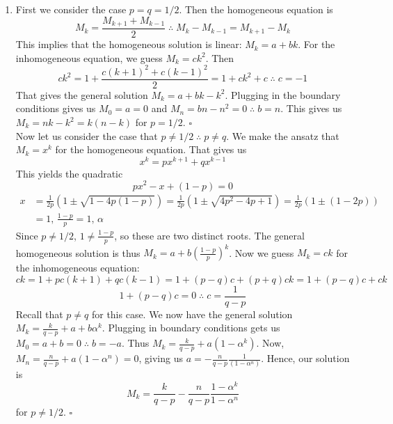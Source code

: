 \documentclass[letterpaper,12pt]{article}
\renewcommand*{\qed}{\hfill\ensuremath{\square}}
\begin{document}
\begin{flushleft}
\begin{enumerate}[label=(\alph*)]
        \item
        First we consider the case $p = q = 1/2$. Then the homogeneous equation is
        $$M_k = \frac{M_{k+1} + M_{k-1}}{2} \; \therefore \; M_{k} - M_{k-1} = M_{k+1} - M_{k}$$
        This implies that the homogeneous solution is linear: $M_k = a + bk$. For the inhomogeneous equation, we guess $M_k = ck^2$. Then
        $$ck^2 = 1 + \frac{c(k+1)^2 + c(k-1)^2}{2} = 1 + ck^2 + c \; \therefore \; c = -1$$
        That gives the general solution $M_k = a + bk - k^2$. Plugging in the boundary conditions gives us $M_0 = a = 0$ and $M_n = bn - n^2 = 0 \; \therefore \; b = n$. This gives us $M_k = nk - k^2 = k(n-k)$ for $p = 1/2$.
        \qed\\
        Now let us consider the case that $p \neq 1/2 \; \therefore \; p \neq q$. We make the ansatz that $M_k = x^k$ for the homogeneous equation. That gives us
        $$x^k = px^{k+1} + qx^{k-1}$$
        This yields the quadratic
        $$px^2 - x + (1-p) = 0$$
        \begin{align*}
            x &= \frac{1}{2p} \left(1 \pm \sqrt{1 - 4p(1-p)}\right) = \frac{1}{2p} \left(1 \pm \sqrt{4p^2 - 4p + 1}\right) = \frac{1}{2p} \left(1 \pm (1 - 2p)\right) \\
            &= 1, \, \frac{1 - p}{p} = 1, \, \alpha
        \end{align*}
        Since $p \neq 1/2$, $1 \neq \frac{1-p}{p}$, so these are two distinct roots. The general homogeneous solution is thus $M_k = a + b\left(\frac{1 - p}{p}\right)^k$. Now we guess $M_k = ck$ for the inhomogeneous equation:
        $$ck = 1 + pc(k + 1) + qc(k - 1) = 1 + (p - q)c + (p + q)ck = 1 + (p - q)c + ck$$
        $$1 + (p - q)c = 0 \; \therefore \; c = \frac{1}{q - p}$$
        Recall that $p \neq q$ for this case. We now have the general solution $M_k = \frac{k}{q - p} + a + b\alpha^k$. Plugging in boundary conditions gets us $M_0 = a + b = 0 \; \therefore \; b = -a$. Thus $M_k = \frac{k}{q - p} + a\left(1 - \alpha^k\right)$. Now, $M_n = \frac{n}{q - p} + a\left(1 - \alpha^n\right) = 0$, giving us $a = -\frac{n}{q - p}\frac{1}{\left(1 - \alpha^n\right)}$. Hence, our solution is
        $$M_k = \frac{k}{q - p} - \frac{n}{q - p}\frac{1 - \alpha^k}{1 - \alpha^n}$$
        for $p \neq 1/2$.
        \qed

    \end{enumerate}

\end{flushleft}
\end{document}
